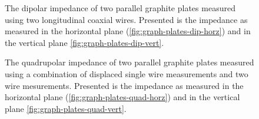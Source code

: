 \documentclass[12pt,a4paper,twopage,openright]{article}
\begin{document}
\begin{figure}
\caption{The dipolar impedance of two parallel graphite plates measured using two longitudinal coaxial wires. Presented is the impedance as measured in the horizontal plane (\ref{fig:graph-plates-dip-horz}) and in the vertical plane \ref{fig:graph-plates-dip-vert}.}
\label{fig:graph-plates-dipolar}
\end{figure}

\begin{figure}
\caption{The quadrupolar impedance of two parallel graphite plates measured using a combination of displaced single wire measurements and two wire mesurements. Presented is the impedance as measured in the horizontal plane (\ref{fig:graph-plates-quad-horz}) and in the vertical plane \ref{fig:graph-plates-quad-vert}.}
\label{fig:graph-plates-quadrupolar}
\end{figure}
\end{document}
